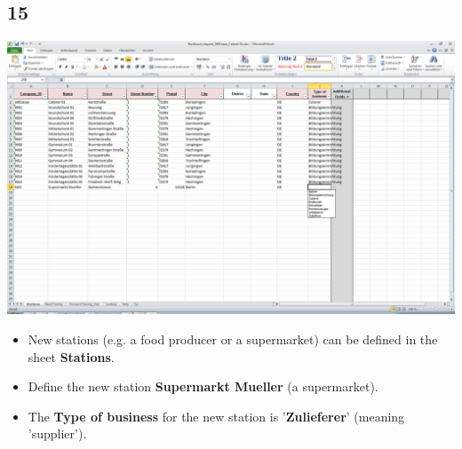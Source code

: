 \documentclass{beamer}
\begin{document}
\subsection{15}
\begin{frame}
	\begin{center}
  		\includegraphics[height=0.6\textheight]{15.png}
	\end{center}
	\begin{itemize}
		\item New stations (e.g. a food producer or a supermarket) can be defined in the sheet \textbf{Stations}.
		\item Define the new station \textbf{Supermarkt Mueller} (a supermarket).
		\item The \textbf{Type of business} for the new station is '\textbf{Zulieferer}' (meaning 'supplier').
	\end{itemize}
\end{frame}
\end{document}
